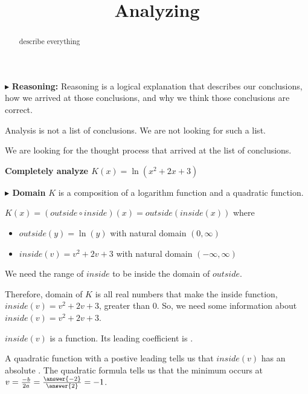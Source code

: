 \documentclass{ximera}
\title{Analyzing}
\begin{document}
\begin{abstract}
describe everything
\end{abstract}
\maketitle



$\blacktriangleright$ \textbf{\textcolor{red!80!black}{Reasoning:}} Reasoning is a logical explanation that describes our conclusions, how we arrived at those conclusions, and why we think those conclusions are correct. 

Analysis is not a list of conclusions. We are not looking for such a list. 

We are looking for the thought process that arrived at the list of conclusions. 








\textbf{\textcolor{purple!85!blue}{Completely analyze $K(x) = \ln(x^2+2x+3)$}} 



\textbf{\textcolor{blue!55!black}{$\blacktriangleright$ Domain}}  $K$ is a composition of a logarithm function and a quadratic function. 


$K(x) = (outside \circ inside)(x) = outside(inside(x))$ where


\begin{itemize}
\item $outside(y) = \ln(y)$ with natural domain  $(0, \infty)$ \\
\item $inside(v) = v^2 + 2v + 3$ with natural domain $(-\infty, \infty)$
\end{itemize}


We need the range of $inside$ to be inside the domain of $outside$.

Therefore, domain of $K$ is all real numbers that make the inside function, $inside(v)=v^2+2v+3$, greater than $0$.  So, we need some information about $inside(v)=v^2+2v+3$.   


$inside(v)$ is a   function.  Its leading coefficient is . 


A quadratic function with a postive leading tells us that $inside(v)$ has an absolute .  The quadratic formula tells us that the minimum occurs at $v=\frac{-b}{2a} = \frac{\answer{-2}}{\answer{2}} = -1$. 
\end{document}
